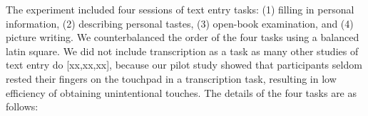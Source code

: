 
The experiment included four sessions of text entry tasks: (1) filling in personal information, (2) describing personal tastes, (3) open-book examination, and (4) picture writing. We counterbalanced the order of the four tasks using a balanced latin square. We did not include transcription as a task as many other studies of text entry do [xx,xx,xx], because our pilot study showed that participants seldom rested their fingers on the touchpad in a transcription task, resulting in low efficiency of obtaining unintentional touches. The details of the four tasks are as follows:


